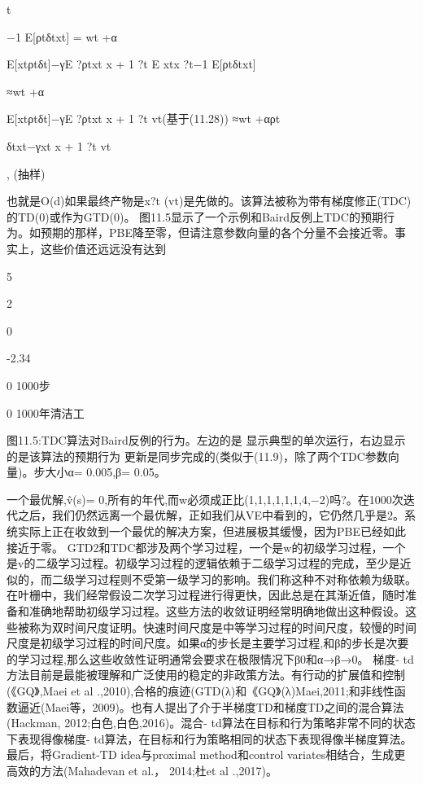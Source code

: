 t

−1 E[ρtδtxt]
= wt +α

E[xtρtδt]−γE ?ρtxt x + 1 ?t E xtx ?t−1 E[ρtδtxt]

≈wt +α

E[xtρtδt]−γE ?ρtxt x + 1 ?t vt(基于(11.28))
≈wt +αρt

δtxt−γxt x + 1 ?t vt

, 					(抽样)

也就是O(d)如果最终产物是x?t (vt)是先做的。该算法被称为带有梯度修正(TDC)的TD(0)或作为GTD(0)。
图11.5显示了一个示例和Baird反例上TDC的预期行为。如预期的那样，PBE降至零，但请注意参数向量的各个分量不会接近零。事实上，这些价值还远远没有达到
 
5




2




0




-2.34


0 					1000步
 
0 					1000年清洁工

图11.5:TDC算法对Baird反例的行为。左边的是
显示典型的单次运行，右边显示的是该算法的预期行为
更新是同步完成的(类似于(11.9)，除了两个TDC参数向量)。步大小α= 0.005,β= 0.05。

一个最优解,v̂(s)= 0,所有的年代,而w必须成正比(1,1,1,1,1,1,4,−2)吗?。在1000次迭代之后，我们仍然远离一个最优解，正如我们从VE中看到的，它仍然几乎是2。系统实际上正在收敛到一个最优的解决方案，但进展极其缓慢，因为PBE已经如此接近于零。
GTD2和TDC都涉及两个学习过程，一个是w的初级学习过程，一个是v的二级学习过程。初级学习过程的逻辑依赖于二级学习过程的完成，至少是近似的，而二级学习过程则不受第一级学习的影响。我们称这种不对称依赖为级联。在叶栅中，我们经常假设二次学习过程进行得更快，因此总是在其渐近值，随时准备和准确地帮助初级学习过程。这些方法的收敛证明经常明确地做出这种假设。这些被称为双时间尺度证明。快速时间尺度是中等学习过程的时间尺度，较慢的时间尺度是初级学习过程的时间尺度。如果α的步长是主要学习过程,和β的步长是次要的学习过程,那么这些收敛性证明通常会要求在极限情况下β0和α→β→0。
梯度- td方法目前是最能被理解和广泛使用的稳定的非政策方法。有行动的扩展值和控制(《GQ》,Maei et al .,2010),合格的痕迹(GTD(λ)和《GQ》(λ)Maei,2011;和非线性函数逼近(Maei等，2009)。也有人提出了介于半梯度TD和梯度TD之间的混合算法(Hackman, 2012;白色,白色,2016)。混合- td算法在目标和行为策略非常不同的状态下表现得像梯度- td算法，在目标和行为策略相同的状态下表现得像半梯度算法。最后，将Gradient-TD idea与proximal method和control variates相结合，生成更高效的方法(Mahadevan et al.， 2014;杜et al .,2017)。



